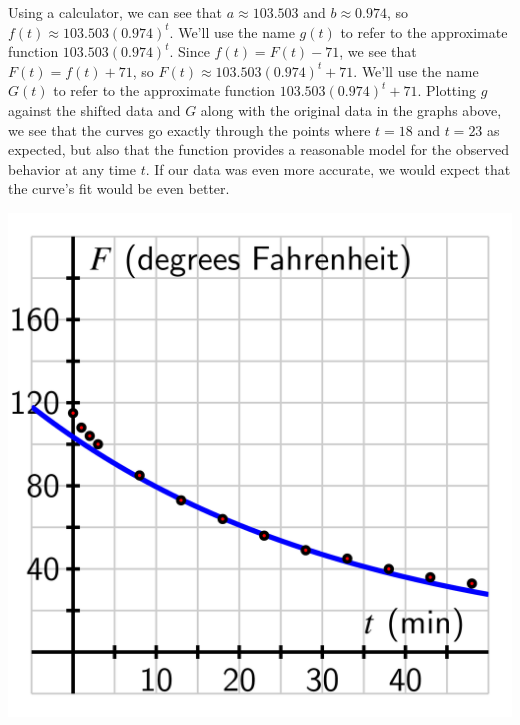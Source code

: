 \documentclass[nooutcomes]{ximera}
\begin{document}
Using a calculator, we can see that $a \approx 103.503$ and $b \approx 0.974$, so $f(t) \approx 103.503 ( 0.974)^t$. We'll use the name $g(t)$ to refer to the approximate function $103.503(0.974)^t$. Since $f(t) = F(t) - 71$, we see that $F(t) = f(t) + 71$, so $F(t) \approx 103.503 (0.974)^t + 71$. We'll use the name $G(t)$ to refer to the approximate function $103.503(0.974)^t+ 71$. Plotting $g$ against the shifted data and $G$ along with the original data in the graphs above, we see that the curves go exactly through the points where $t = 18$ and $t = 23$ as expected, but also that the function provides a reasonable model for the observed behavior at any time $t$.  If our data was even more accurate, we would expect that the curve's fit would be even better.

\begin{image}
\includegraphics{modeling-coffee-shifted.jpg}
\end{image}
\end{document}
